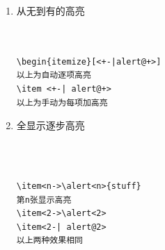 \begin{enumerate}
  \item \textcolor[rgb]{1.00,0.00,0.00}{从无到有的高亮}\\~\\
\\
\begin{shaded}
\begin{Verbatim}
\begin{itemize}[<+-|alert@+>]
以上为自动逐项高亮
\item <+-| alert@+>
以上为手动为每项加高亮
\end{Verbatim}
\end{shaded}


  \item \textcolor[rgb]{1.00,0.00,0.00}{全显示逐步高亮}\\~\\



  \\
\begin{shaded}
\begin{Verbatim}
\item<n->\alert<n>{stuff}
第n张显示高亮
\item<2->\alert<2>
\item<2-| alert@2>
以上两种效果相同
\end{Verbatim}
\end{shaded}


\end{enumerate}
